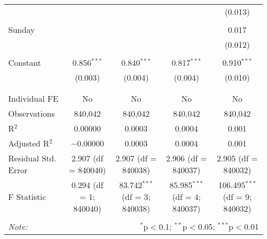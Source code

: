 \documentclass[
]{article}
\begin{document}
\begin{table}[!htbp]
{\begin{tabular}{@{\extracolsep{5pt}}lcccc}
  &  &  &  & (0.013) \\ 
  & & & & \\ 
 Sunday &  &  &  & 0.017 \\ 
  &  &  &  & (0.012) \\ 
  & & & & \\ 
 Constant & 0.856$^{***}$ & 0.840$^{***}$ & 0.817$^{***}$ & 0.910$^{***}$ \\ 
  & (0.003) & (0.004) & (0.004) & (0.010) \\ 
  & & & & \\ 
\hline \\[-1.8ex] 
Individual FE & No & No & No & No \\ 
Observations & 840,042 & 840,042 & 840,042 & 840,042 \\ 
R$^{2}$ & 0.00000 & 0.0003 & 0.0004 & 0.001 \\ 
Adjusted R$^{2}$ & $-$0.00000 & 0.0003 & 0.0004 & 0.001 \\ 
Residual Std. Error & 2.907 (df = 840040) & 2.907 (df = 840038) & 2.906 (df = 840037) & 2.905 (df = 840032) \\ 
F Statistic & 0.294 (df = 1; 840040) & 83.742$^{***}$ (df = 3; 840038) & 85.985$^{***}$ (df = 4; 840037) & 106.495$^{***}$ (df = 9; 840032) \\ 
\hline 
\hline \\[-1.8ex] 
\textit{Note:}  & \multicolumn{4}{r}{$^{*}$p$<$0.1; $^{**}$p$<$0.05; $^{***}$p$<$0.01} \\ 
\end{tabular}
} 
\end{table} 
\newpage
\end{document}
